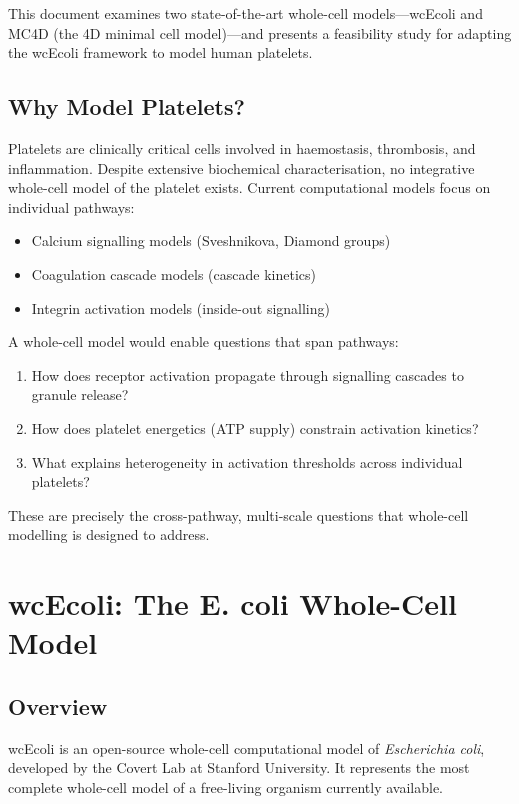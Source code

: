 \documentclass[11pt,a4paper]{report}
\begin{document}
This document examines two state-of-the-art whole-cell models---wcEcoli and MC4D (the 4D minimal cell model)---and presents a feasibility study for adapting the wcEcoli framework to model human platelets.

\section{Why Model Platelets?}

Platelets are clinically critical cells involved in haemostasis, thrombosis, and inflammation. Despite extensive biochemical characterisation, no integrative whole-cell model of the platelet exists. Current computational models focus on individual pathways:

\begin{itemize}
    \item Calcium signalling models (Sveshnikova, Diamond groups)
    \item Coagulation cascade models (cascade kinetics)
    \item Integrin activation models (inside-out signalling)
\end{itemize}

A whole-cell model would enable questions that span pathways:

\begin{enumerate}
    \item How does receptor activation propagate through signalling cascades to granule release?
    \item How does platelet energetics (ATP supply) constrain activation kinetics?
    \item What explains heterogeneity in activation thresholds across individual platelets?
\end{enumerate}

These are precisely the cross-pathway, multi-scale questions that whole-cell modelling is designed to address.

\chapter{wcEcoli: The E. coli Whole-Cell Model}

\section{Overview}

wcEcoli is an open-source whole-cell computational model of \emph{Escherichia coli}, developed by the Covert Lab at Stanford University. It represents the most complete whole-cell model of a free-living organism currently available.
\end{document}
